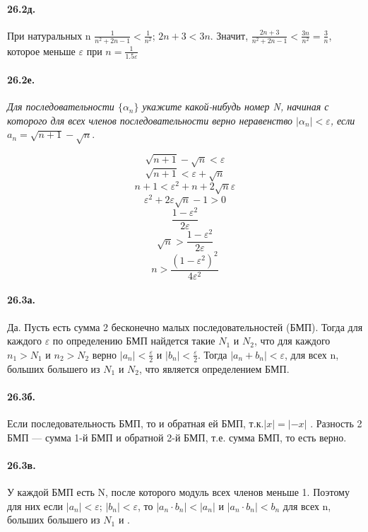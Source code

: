 \documentclass{book}
\begin{document}
\paragraph{26.2д.}
При натуральных n $\frac{1}{n^2+2n-1} < \frac{1}{n^2}$; $2n + 3 < 3n$. Значит, $\frac{2n+3}{n^2+2n-1} < \frac{3n}{n^2} = \frac{3}{n}$, которое меньше $\varepsilon$ при $n = \frac{1}{1.5 \varepsilon}$

\paragraph{26.2е.}
\textit{Для последовательности $\{\alpha_n\}$ укажите какой-нибудь номер N, начиная с которого для всех членов последовательности верно неравенство $|\alpha_n| < \varepsilon$, если $a_n = \sqrt{n+1} - \sqrt{n}$}.

\[\sqrt{n+1} - \sqrt{n} < \varepsilon\]
\[\sqrt{n+1} < \varepsilon + \sqrt{n}\]
\[n+1 < \varepsilon^2 + n + 2\sqrt{n}\varepsilon\]
\[\varepsilon^2 + 2 \varepsilon \sqrt{n} - 1 > 0\]
\[\frac{1 - \varepsilon^2}{2 \varepsilon}\]
\[\sqrt{n} > \frac{1 - \varepsilon^2}{2 \varepsilon}\]
\[n > \frac{(1 - \varepsilon^2)^2}{{4\varepsilon^2}} \]

\paragraph{26.3а.}
Да. Пусть есть сумма 2 бесконечно малых последовательностей (БМП). Тогда для каждого $\varepsilon$ по определению БМП найдется такие $N_1$ и $N_2$, что для каждого $n_1 > N_1$ и $n_2 > N_2$ верно $|a_n|<\frac{\varepsilon}{2}$ и $|b_n|<\frac{\varepsilon}{2}$. Тогда $|a_n + b_n| < \varepsilon$, для всех n, больших большего из $N_1$ и $N_2 $, что является определением БМП.

\paragraph{26.3б.}
Если последовательность БМП, то и обратная ей БМП, т.к.$|x| = |-x|$ . Разность 2 БМП — сумма 1-й БМП и обратной 2-й БМП, т.е. сумма БМП, то есть верно.

\paragraph{26.3в.}
У каждой БМП есть N, после которого модуль всех членов меньше 1. Поэтому для них если $|a_n|<\varepsilon$; $|b_n|<\varepsilon$, то $|a_n \cdot b_n|<|a_n|$ и $|a_n \cdot b_n| < b_n$ для всех n, больших большего из $N_1$ и . 
\end{document}
